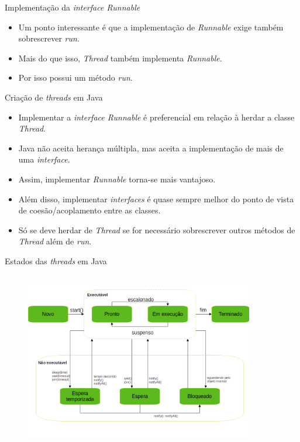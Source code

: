 \documentclass[11pt,justified]{beamer}
\begin{document}
\begin{frame}{Implementação da \textit{interface Runnable}}
    \begin{itemize}
        \item Um ponto interessante é que a implementação de \textit{Runnable} exige também sobrescrever \textit{run}.
        \item Mais do que isso, \textit{Thread} também implementa \textit{Runnable}.
        \item Por isso possui um método \textit{run}.
    \end{itemize}
\end{frame}

\begin{frame}{Criação de \textit{threads} em Java}
    \begin{itemize}
        \item Implementar a \textit{interface Runnable} é preferencial em relação à herdar a classe \textit{Thread}.
        \item Java não aceita herança múltipla, mas aceita a implementação de mais de uma \textit{interface}.
        \item Assim, implementar \textit{Runnable} torna-se mais vantajoso.
        \item Além disso, implementar \textit{interfaces} é quase sempre melhor do ponto de vista de coesão/acoplamento entre as classes.
        \item Só se deve herdar de \textit{Thread} se for necessário sobrescrever outros métodos de \textit{Thread} além de \textit{run}.
    \end{itemize}
\end{frame}

\begin{frame}{Estados das \textit{threads} em Java}
    \begin{figure}[ht]
        \centering
        \includegraphics[height=7.6cm, width=10cm]{figures/thread_ciclo_de_vida.png}
    \end{figure}
\end{frame}
\end{document}
